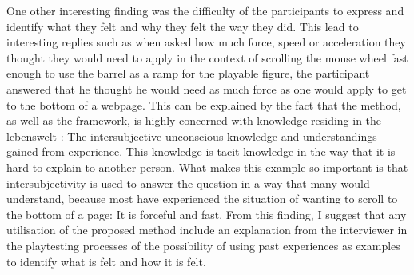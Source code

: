 One other interesting finding was the difficulty of the participants to express and identify what they felt and why they felt the way they did. This lead to interesting replies such as when asked how much force, speed or acceleration they thought they would need to apply in the context of scrolling the mouse wheel fast enough to use the barrel as a ramp for the playable figure, the participant answered that he thought he would need as much force as one would apply to get to the bottom of a webpage. This can be explained by the fact that the method, as well as the framework, is highly concerned with knowledge residing in the lebenswelt \cite{dourish}: The intersubjective unconscious knowledge and understandings gained from experience. This knowledge is tacit knowledge in the way that it is hard to explain to another person. What makes this example so important is that intersubjectivity is used to answer the question in a way that many would understand, because most have experienced the situation of wanting to scroll to the bottom of a page: It is forceful and fast. From this finding, I suggest that any utilisation of the proposed method include an explanation from the interviewer in the playtesting processes of the possibility of using past experiences as examples to identify what is felt and how it is felt.

